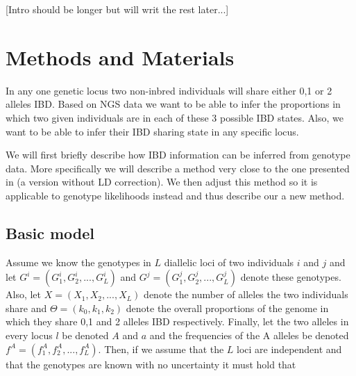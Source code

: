 \documentclass[a4paper, 11pt]{article}
\begin{document}
[Intro should be longer but will writ the rest later...]

\section*{Methods and Materials}
In any one genetic locus two non-inbred individuals will share either 0,1 or 2 alleles IBD. Based on NGS data we want to be able to infer the proportions in which two given individuals are in each of these 3 possible IBD states. Also, we want to be able to infer their IBD sharing state in any specific locus. 

We will first briefly describe how IBD information %
can be inferred from genotype data. More specifically we will describe a method very close to the one presented in \cite{Albrechtsen09} (a version without LD correction). We then adjust this method so it is applicable to genotype likelihoods instead and thus describe our a new method.

\subsection*{Basic model}
Assume we know the genotypes in $L$ diallelic loci of two individuals $i$ and $j$ and let $G^{i}=(G^{i}_1,G^{i}_2,...,G^{i}_L)$ and $G^{j}=(G^{j}_1,G^{j}_2,...,G^{j}_L)$ denote these genotypes. %
Also, let $X = (X_1,X_2,...,X_L)$ denote the number of alleles the two individuals share and $\Theta=(k_0,k_1,k_2)$ denote the overall proportions of the genome in which they share 0,1 and 2 alleles IBD respectively. Finally, let the two alleles in every locus $l$ be denoted $A$ and $a$ and the frequencies of the A alleles be denoted $f^A=(f^A_1,f^A_2,..., f^A_L)$. Then, if we assume that the $L$ loci are independent and that the genotypes are known with no uncertainty it must hold that
\end{document}
